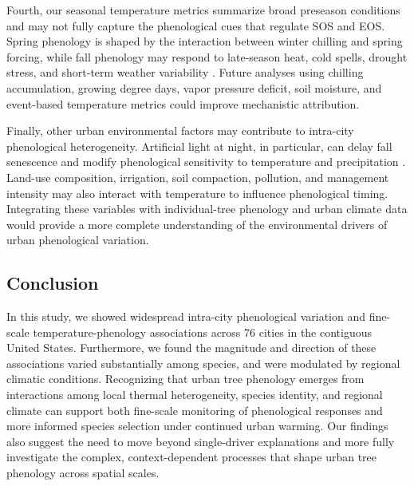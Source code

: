 Fourth, our seasonal temperature metrics summarize broad preseason conditions and may not fully capture the phenological cues that regulate SOS and EOS. Spring phenology is shaped by the interaction between winter chilling and spring forcing, while fall phenology may respond to late-season heat, cold spells, drought stress, and short-term weather variability \citep{Chuine2010Science, Fu2015Nature, wang_overestimation_2020}. Future analyses using chilling accumulation, growing degree days, vapor pressure deficit, soil moisture, and event-based temperature metrics could improve mechanistic attribution.

Finally, other urban environmental factors may contribute to intra-city phenological heterogeneity. Artificial light at night, in particular, can delay fall senescence and modify phenological sensitivity to temperature and precipitation \citep{Chen2026NatCommun, Friulla2025UrbanSci, Meng2022PNASNexus, Wang2025NatCities}. Land-use composition, irrigation, soil compaction, pollution, and management intensity may also interact with temperature to influence phenological timing. Integrating these variables with individual-tree phenology and urban climate data would provide a more complete understanding of the environmental drivers of urban phenological variation.

\subsection{Conclusion}

In this study, we showed widespread intra-city phenological variation and fine-scale temperature-phenology associations across 76 cities in the contiguous United States. Furthermore, we found the magnitude and direction of these associations varied substantially among species, and were modulated by regional climatic conditions. Recognizing that urban tree phenology emerges from interactions among local thermal heterogeneity, species identity, and regional climate can support both fine-scale monitoring of phenological responses and more informed species selection under continued urban warming. Our findings also suggest the need to move beyond single-driver explanations and more fully investigate the complex, context-dependent processes that shape urban tree phenology across spatial scales.